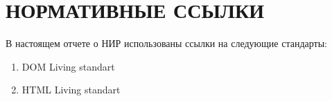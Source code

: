 \section*{НОРМАТИВНЫЕ ССЫЛКИ}

В настоящем отчете о НИР использованы ссылки на следующие стандарты:

\begin{enumerate}[label=\arabic*)]
	\item DOM Living standart \cite{dom-doc}
	\item HTML Living standart \cite{html-doc}
\end{enumerate}

\pagebreak